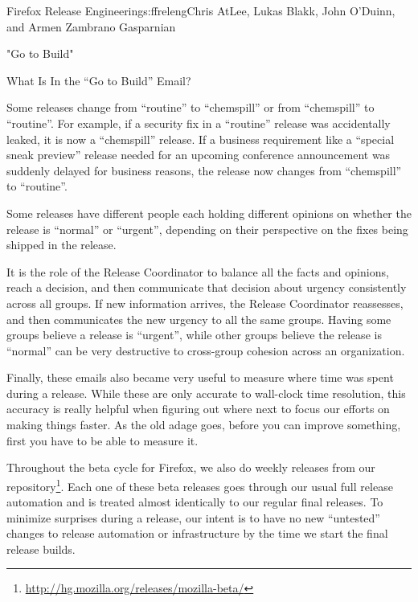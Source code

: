 \begin{aosachapter}{Firefox Release Engineering}{s:ffreleng}{Chris AtLee, Lukas Blakk, John O'Duinn, and Armen Zambrano Gasparnian}
\begin{aosasect1}{"Go to Build"}
\begin{aosasect2}{What Is In the ``Go to Build'' Email?}
\begin{aosaenumerate}
\begin{aosaenumerate2}
    \item Some releases change from ``routine'' to ``chemspill'' or
      from ``chemspill'' to ``routine''. For example, if a security
      fix in a ``routine'' release was accidentally leaked, it is now
      a ``chemspill'' release. If a business requirement like a
      ``special sneak preview'' release needed for an upcoming
      conference announcement was suddenly delayed for business
      reasons, the release now changes from ``chemspill'' to
      ``routine''.

    \item Some releases have different people each holding different
      opinions on whether the release is ``normal'' or ``urgent'',
      depending on their perspective on the fixes being shipped in the
      release.

  \end{aosaenumerate2}

\end{aosaenumerate}

It is the role of the Release Coordinator to balance all the facts and
opinions, reach a decision, and then communicate that decision about
urgency consistently across all groups. If new information arrives,
the Release Coordinator reassesses, and then communicates the new
urgency to all the same groups. Having some groups believe a release
is ``urgent'', while other groups believe the release is ``normal''
can be very destructive to cross-group cohesion across an
organization.

Finally, these emails also became very useful to measure where time
was spent during a release.  While these are only accurate to
wall-clock time resolution, this accuracy is really helpful when
figuring out where next to focus our efforts on making things faster.
As the old adage goes, before you can improve something, first you
have to be able to measure it.

Throughout the beta cycle for Firefox, we also do weekly releases from
our 
repository\footnote{\url{http://hg.mozilla.org/releases/mozilla-beta/}}. Each
one of these beta releases goes through our usual full release
automation and is treated almost identically to our regular final
releases. To minimize surprises during a release, our intent is to
have no new ``untested'' changes to release automation or
infrastructure by the time we start the final release builds.

\end{aosasect2}


\end{aosasect1}
\end{aosachapter}
